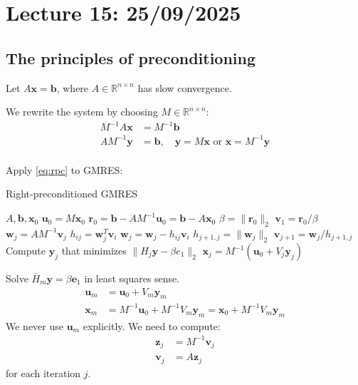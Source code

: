 \section{Lecture 15: 25/09/2025}

\subsection{The principles of preconditioning}
Let $A \mathbf{x} = \mathbf{b}$, where $A \in \mathbb{R}^{n \times n}$ has slow convergence.

We rewrite the system by choosing $M \in \mathbb{R}^{n \times n}$:
\begin{align}
    M^{-1} A \mathbf{x} & = M^{-1} \mathbf{b} \tag{LPC}\label{eq:lpc}                                                                       \\
    A M^{-1} \mathbf{y} & = \mathbf{b}, \quad \mathbf{y} = M \mathbf{x} \text{ or } \mathbf{x} = M^{-1} \mathbf{y} \tag{RPC} \label{eq:rpc} \\
\end{align}

Apply \eqref{eq:rpc} to GMRES:
\begin{algorithm}[H]
    \caption{Right-preconditioned GMRES}
    \begin{algorithmic}
        \Require
        \State $A, \mathbf{b}, \mathbf{x}_0$
        \State $\mathbf{u}_0 = M \mathbf{x}_0$
        \State $\mathbf{r}_0 = \mathbf{b} - A M^{-1} \mathbf{u}_0 = \mathbf{b} - A \mathbf{x}_0$
        \State $\beta = \| \mathbf{r}_0 \|_2$
        \State $\mathbf{v}_1 = \mathbf{r}_0 / \beta$
        \State $\mathbf{w}_j = A M^{-1} \mathbf{v}_j$
        \State $h_{ij} = \mathbf{w}_j^T \mathbf{v}_i$
        \State $\mathbf{w}_j = \mathbf{w}_j - h_{ij} \mathbf{v}_i$
        \EndFor
        \State $h_{j+1,j} = \| \mathbf{w}_j \|_2$
        \State $\mathbf{v}_{j+1} = \mathbf{w}_j / h_{j+1,j}$
        \State Compute $\mathbf{y}_j$ that minimizes $\| H_j \mathbf{y} - \beta e_1 \|_2$
        \State $\mathbf{x}_j = M^{-1} (\mathbf{u}_0 + V_j \mathbf{y}_j)$
        \EndFor
    \end{algorithmic}
\end{algorithm}

Solve $\bar{H}_m \mathbf{y} = \beta \mathbf{e}_1$ in least squares sense.
\begin{align*}
    \mathbf{u}_m & = \mathbf{u}_0 + V_m \mathbf{y}_m                                                        \\
    \mathbf{x}_m & = M^{-1} \mathbf{u}_0 + M^{-1} V_m \mathbf{y}_m = \mathbf{x}_0 + M^{-1} V_m \mathbf{y}_m
\end{align*}
We never use $\mathbf{u}_m$ explicitly.
We need to compute:
\begin{align*}
    \mathbf{z}_j & = M^{-1} \mathbf{v}_j \\
    \mathbf{v}_j & = A \mathbf{z}_j
\end{align*}
for each iteration $j$.

